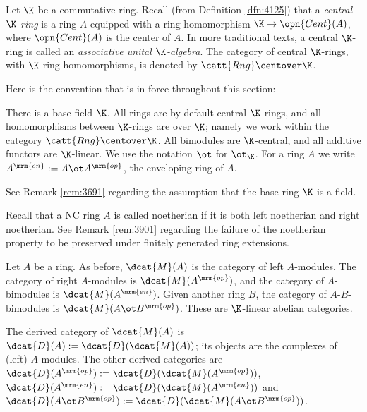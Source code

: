 Let $\K$ be a commutative ring. 
Recall (from Definition \ref{dfn:4125}) that a {\em central $\K$-ring} is a 
ring $A$ equipped with a ring homomorphism $\K \to \opn{Cent}(A)$, where 
$\opn{Cent}(A)$ is the center of $A$. 
In more traditional texts, a central $\K$-ring is called an {\em associative 
unital $\K$-algebra}. The category of central $\K$-rings, with $\K$-ring 
homomorphisms, is denoted by $\catt{Rng} \centover \K$. 

Here is the convention that is in force throughout this section:

\begin{conv} \label{conv:3670} 
There is a  base field $\K$. All rings are by default central 
$\K$-rings, and all homomorphisms between $\K$-rings are over $\K$; namely we 
work within the category $\catt{Rng} \centover \K$.
All bimodules are $\K$-central, and all additive functors are $\K$-linear.
We use the notation $\ot$ for $\ot_{\K}$. For a ring $A$ we write 
$A^{\mrm{en}} := A \ot A^{\mrm{op}}$, the enveloping ring of $A$. 
\end{conv}

See Remark \ref{rem:3691} regarding the assumption that the base ring 
$\K$ is a field.    

Recall that a NC ring $A$ is called noetherian if it
is both left noetherian and right noetherian.
See Remark \ref{rem:3901} regarding the failure of the noetherian property to 
be preserved under finitely generated ring extensions. 

Let $A$ be a ring. As before, $\dcat{M}(A)$ is the category of left 
$A$-modules. The category of right $A$-modules is $\dcat{M}(A^{\mrm{op}})$,
and the category of $A$-bimodules is $\dcat{M}(A^{\mrm{en}})$.
Given another ring $B$, the category of $A$-$B$-bimodules is 
$\dcat{M}(A \ot B^{\mrm{op}})$.
These are $\K$-linear abelian categories. 

The derived category of $\dcat{M}(A)$ is 
$\dcat{D}(A) := \dcat{D}(\dcat{M}(A))$; its objects are the 
complexes of (left) $A$-modules. 
The other derived categories are  
$\dcat{D}(A^{\mrm{op}}) := \dcat{D}(\dcat{M}(A^{\mrm{op}}))$,
$\dcat{D}(A^{\mrm{en}}) := \dcat{D}(\dcat{M}(A^{\mrm{en}}))$
and 
$\dcat{D}(A \ot B^{\mrm{op}}) := \dcat{D}(\dcat{M}(A \ot B^{\mrm{op}}))$.

